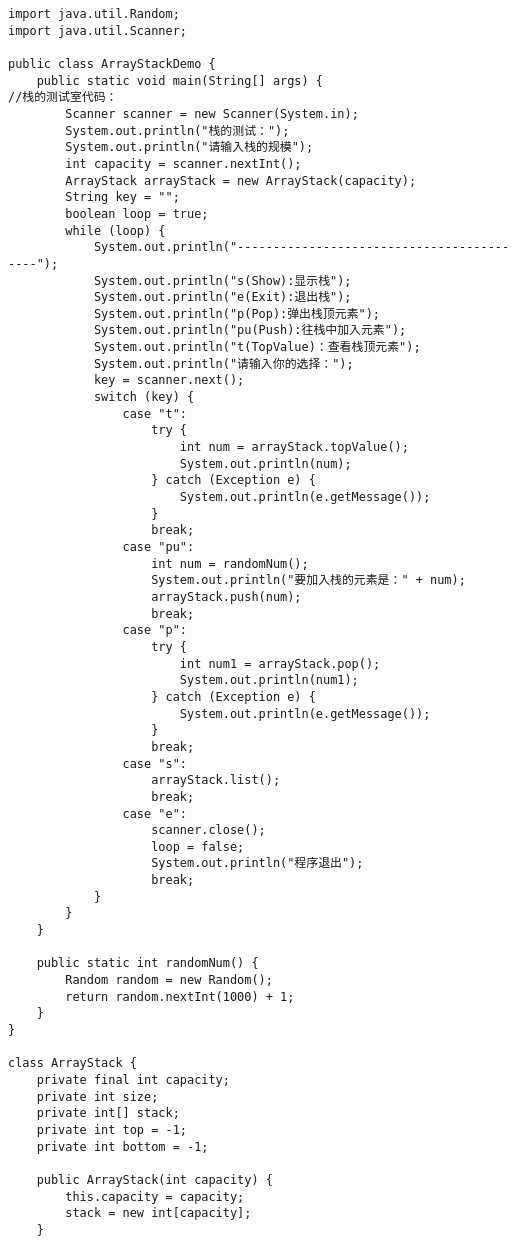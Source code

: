 \documentclass[a4paper]{report}
\begin{document}
\begin{lstlisting}
import java.util.Random;
import java.util.Scanner;

public class ArrayStackDemo {
    public static void main(String[] args) {
//栈的测试室代码：
        Scanner scanner = new Scanner(System.in);
        System.out.println("栈的测试：");
        System.out.println("请输入栈的规模");
        int capacity = scanner.nextInt();
        ArrayStack arrayStack = new ArrayStack(capacity);
        String key = "";
        boolean loop = true;
        while (loop) {
            System.out.println("------------------------------------------");
            System.out.println("s(Show):显示栈");
            System.out.println("e(Exit):退出栈");
            System.out.println("p(Pop):弹出栈顶元素");
            System.out.println("pu(Push):往栈中加入元素");
            System.out.println("t(TopValue)：查看栈顶元素");
            System.out.println("请输入你的选择：");
            key = scanner.next();
            switch (key) {
                case "t":
                    try {
                        int num = arrayStack.topValue();
                        System.out.println(num);
                    } catch (Exception e) {
                        System.out.println(e.getMessage());
                    }
                    break;
                case "pu":
                    int num = randomNum();
                    System.out.println("要加入栈的元素是：" + num);
                    arrayStack.push(num);
                    break;
                case "p":
                    try {
                        int num1 = arrayStack.pop();
                        System.out.println(num1);
                    } catch (Exception e) {
                        System.out.println(e.getMessage());
                    }
                    break;
                case "s":
                    arrayStack.list();
                    break;
                case "e":
                    scanner.close();
                    loop = false;
                    System.out.println("程序退出");
                    break;
            }
        }
    }

    public static int randomNum() {
        Random random = new Random();
        return random.nextInt(1000) + 1;
    }
}

class ArrayStack {
    private final int capacity;
    private int size;
    private int[] stack;
    private int top = -1;
    private int bottom = -1;

    public ArrayStack(int capacity) {
        this.capacity = capacity;
        stack = new int[capacity];
    }


\end{lstlisting}
\end{document}
